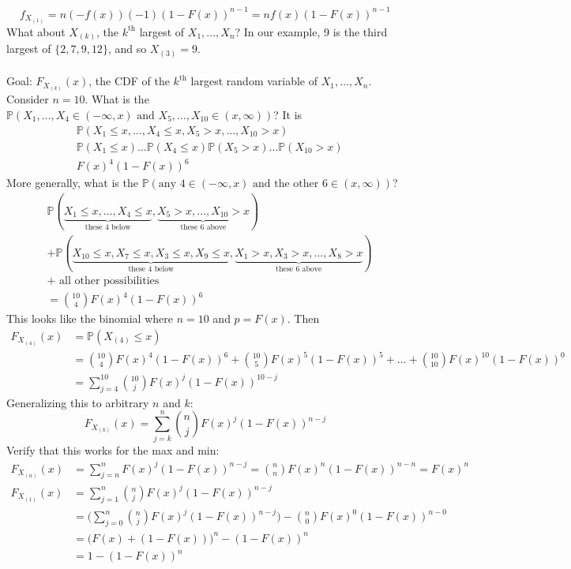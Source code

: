 \documentclass[12pt]{article}
\newcommand{\prob}[1]{\mathbb{P}(#1)}
\newcommand{\set}[1]{\Big\{ #1 \Big\}}
\newcommand{\ostat}[2]{#1_{(#2)}}
\begin{document}
$$f_{\ostat{X}{1}} = n(-f(x))(-1)(1 - F(x))^{n - 1} = nf(x)(1 - F(x))^{n - 1} $$
What about $\ostat{X}{k}$, the $k^\text{th}$ largest of $X_1, \dots, X_n$? In our example, 9 is the third largest of $\set{2, 7, 9, 12}$, and so $\ostat{X}{3} = 9$. \\~\\
Goal: $F_{\ostat{X}{k}}(x)$, the CDF of the $k^\text{th}$ largest random variable of $X_1, \dots, X_n$. \\ 
Consider $n = 10$. What is the $\prob{X_1, \dots, X_4 \in (-\infty, x) \text{ and } X_5, \dots, X_{10} \in (x, \infty)}$? It is $$ \begin{aligned} &\prob{X_1 \leq x, \dots, X_4 \leq x, X_5 > x, \dots, X_{10} > x} \\ &\prob{X_1 \leq x}\dots \prob{X_4 \leq x}\prob{X_5 > x}\dots \prob{X_{10} > x} \\ &F(x)^4(1 - F(x))^6 \end{aligned} $$ More generally, what is the $\prob{\text{any } 4 \in (-\infty, x) \text{ and the other } 6 \in (x, \infty)}$? $$\begin{aligned} &\prob{\underbrace{X_1 \leq x, \dots, X_4 \leq x}_{\text{these 4 below}}, \underbrace{X_5 > x, \dots, X_{10} > x}_{\text{these 6 above}}} \\ &+ \prob{\underbrace{X_{10} \leq x, X_7 \leq x, X_3 \leq x, X_9 \leq x}_{\text{these 4 below}}, \underbrace{X_1 > x, X_3 > x, \dots, X_8 > x}_{\text{these 6 above}}} \\ &+ \text{ all other possibilities} \\ &= \binom{10}{4}F(x)^4(1 - F(x))^6 \end{aligned} $$ This looks like the binomial where $n = 10$ and $p = F(x)$. Then $$\begin{aligned} F_{\ostat{X}{4}}(x) &= \prob{\ostat{X}{4} \leq x} \\ &= \binom{10}{4}F(x)^4(1 - F(x))^6 + \binom{10}{5}F(x)^5(1 - F(x))^5 + \dots + \binom{10}{10}F(x)^{10}(1 - F(x))^0 \\ &= \sum_{j = 4}^{10} \binom{10}{j} F(x)^j(1 - F(x))^{10 - j} \end{aligned} $$ 
Generalizing this to arbitrary $n$ and $k$: $$ F_{\ostat{X}{k}}(x) = \sum_{j = k}^n \binom{n}{j} F(x)^j (1 - F(x))^{n - j} $$ Verify that this works for the max and min: 
$$ \begin{aligned} F_{\ostat{X}{n}}(x) &= \sum_{j = n}^n F(x)^j(1 - F(x))^{n - j} = \binom{n}{n} F(x)^n(1 - F(x))^{n - n} = F(x)^n \\ F_{\ostat{X}{1}}(x) &= \sum_{j = 1}^n \binom{n}{j} F(x)^j (1 - F(x))^{n - j} \\ &= \Bigg( \sum_{j = 0}^n \binom{n}{j} F(x)^j(1 - F(x))^{n- j}\Bigg) - \binom{n}{0}F(x)^0(1 - F(x))^{n-0} \\ &= \Big(F(x) + (1 - F(x))\Big)^n - (1 - F(x))^n \\ &= 1 - (1 - F(x))^n \end{aligned} $$ 
\end{document}
